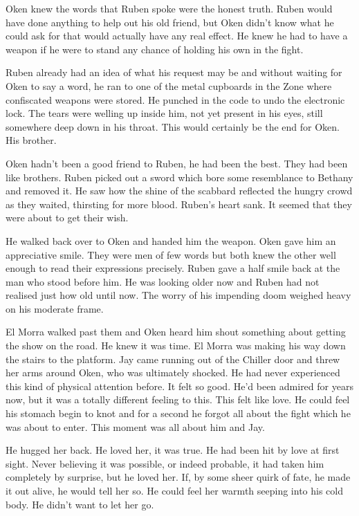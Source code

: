 Oken knew the words that Ruben spoke were the honest truth.  Ruben would have done anything to help out his old friend, but Oken didn't know what he could ask for that would actually have any real effect.  He knew he had to have a weapon if he were to stand any chance of holding his own in the fight.  

Ruben already had an idea of what his request may be and without waiting for Oken to say a word, he ran to one of the metal cupboards in the Zone where confiscated weapons were stored.  He punched in the code to undo the electronic lock.  The tears were welling up inside him, not yet present in his eyes, still somewhere deep down in his throat.  This would certainly be the end for Oken.  His brother.

Oken hadn't been a good friend to Ruben, he had been the best.  They had been like brothers.  Ruben picked out a sword which bore some resemblance to Bethany and removed it.  He saw how the shine of the scabbard reflected the hungry crowd as they waited, thirsting for more blood.  Ruben's heart sank.  It seemed that they were about to get their wish.

He walked back over to Oken and handed him the weapon.  Oken gave him an appreciative smile.  They were men of few words but both knew the other well enough to read their expressions precisely.  Ruben gave a half smile back at the man who stood before him.  He was looking older now and Ruben had not realised just how old until now.  The worry of his impending doom weighed heavy on his moderate frame.  

El Morra walked past them and Oken heard him shout something about getting the show on the road.  He knew it was time.  El Morra was making his way down the stairs to the platform.  Jay came running out of the Chiller door and threw her arms around Oken, who was ultimately shocked.  He had never experienced this kind of physical attention before.  It felt so good.  He'd been admired for years now, but it was a totally different feeling to this.  This felt like love.  He could feel his stomach begin to knot and for a second he forgot all about the fight which he was about to enter.  This moment was all about him and Jay.

He hugged her back.  He loved her, it was true.  He had been hit by love at first sight.  Never believing it was possible, or indeed probable, it had taken him completely by surprise, but he loved her.  If, by some sheer quirk of fate, he made it out alive, he would tell her so.  He could feel her warmth seeping into his cold body.  He didn't want to let her go.  

